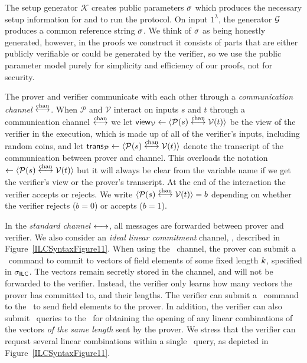 The setup generator $\mathcal{K}$ creates public parameters $\mathsf{\sigma}$ which produces the necessary setup information for \prover and \verifier to run the protocol. On input $1^\lambda$, the generator $\mathcal{G}$ produces a common reference string $\mathsf{\sigma}$. We think of $\mathsf{\sigma}$ as being honestly generated, however, in the proofs we construct it consists of parts that are either publicly verifiable or could be generated by the verifier, so we use the public parameter model purely for simplicity and efficiency of our proofs, not for security.

The prover and verifier communicate with each other through a \emph{communication channel} $\overset{\textnormal{chan}}{\longleftrightarrow}$. When $\mathcal{P}$ and $\mathcal{V}$ interact on inputs $s$ and $t$ through a communication channel $\overset{\textnormal{chan}}{\longleftrightarrow}$ we let $\mathsf{view}_{\mathcal{V}} \leftarrow \langle \mathcal{P}(s) \overset{\textnormal{chan}}{\longleftrightarrow} \mathcal{V}(t)\rangle$ be the view of the verifier in the execution, which is made up of all of the verifier's inputs, including random coins, and let $\mathsf{trans}_{\mathcal{P}} \leftarrow  \langle \mathcal{P}(s) \overset{\textnormal{chan}}{\longleftrightarrow} \mathcal{V}(t)\rangle$ denote the transcript of the communication between prover and channel. This overloads the notation $\leftarrow  \langle \mathcal{P}(s) \overset{\textnormal{chan}}{\longleftrightarrow} \mathcal{V}(t)\rangle$ but it will always be clear from the variable name if we get the verifier's view or the prover's transcript. At the end of the interaction the verifier accepts or rejects. We write $\langle \mathcal{P}(s)\overset{\textnormal{chan}}{\longleftrightarrow} \mathcal{V}(t)\rangle =b$ depending on whether the verifier rejects ($b=0$) or accepts ($b=1$).

In the \emph{standard channel} $\longleftrightarrow$, all messages are forwarded between prover and verifier. 
We also consider an \emph{ideal linear commitment}  channel, \ILC, described in Figure~\ref{ILCSyntaxFigure11}. 
When using the \ILC\ channel, the prover can submit a \ILCcommit\ command to commit to 
vectors of field elements of some fixed length $k$, specified in $\mathsf{\sigma}_{\mathsf{ILC}}$. The vectors remain secretly stored in the channel, and will not be forwarded to the verifier. Instead, the verifier only learns how many vectors the prover has committed to, and their lengths. The verifier can submit a \ILCsend\ command to the \ILC\ to send field elements to the prover. In addition, the verifier can also submit \ILCopen\ queries to the \ILC\ for obtaining the opening of any linear combinations of the vectors \emph{of the same length} sent by the prover. We stress that the verifier can request several linear combinations within a single \ILCopen\ query, as depicted in Figure~\ref{ILCSyntaxFigure11}.

